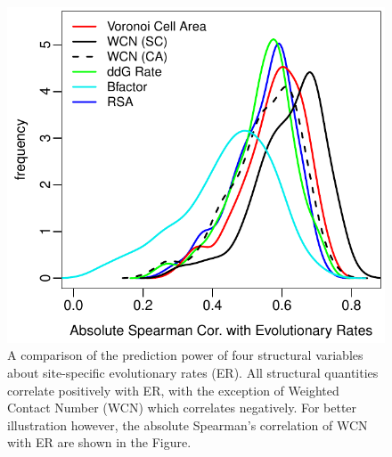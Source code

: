 \documentclass[11pt]{article}
\begin{document}
    \begin{figure}[tbh]
        \begin{center}
        \includegraphics[width=6.9in]{best_structural_predictors_of_ER.pdf}
        \end{center}
        \caption{A comparison of the prediction power of four structural variables about site-specific evolutionary rates (ER). All structural quantities correlate positively with ER, with the exception of Weighted Contact Number (WCN) which correlates negatively. For better illustration however, the absolute Spearman's correlation of WCN with ER are shown in the Figure.}
        \label{fig:best_predictor}
    \end{figure}




\end{document}
